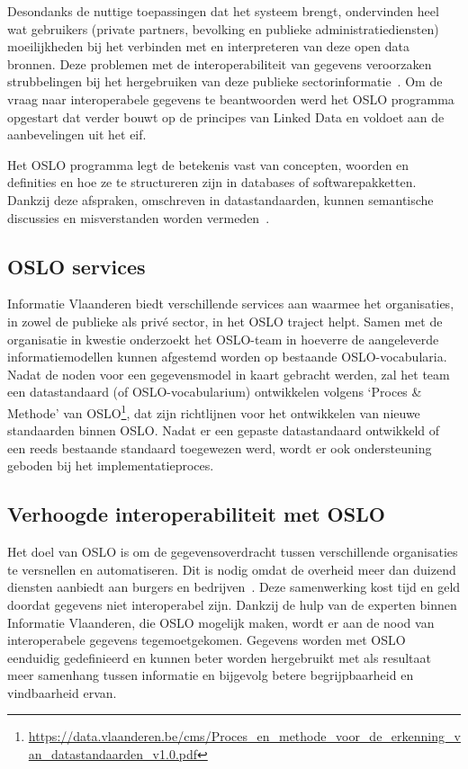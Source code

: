 Desondanks de nuttige toepassingen dat het systeem brengt, ondervinden heel wat gebruikers (private partners, bevolking en publieke administratiediensten) moeilijkheden bij het verbinden met en interpreteren van deze open data bronnen. Deze problemen met de interoperabiliteit van gegevens veroorzaken strubbelingen bij het hergebruiken van deze publieke sectorinformatie~\cite{opengovernment}. Om de vraag naar interoperabele gegevens te beantwoorden werd het OSLO programma opgestart dat verder bouwt op de principes van Linked Data en voldoet aan de aanbevelingen uit het \acrshort{eif}.

Het OSLO programma legt de betekenis vast van concepten, woorden en definities en hoe ze te structureren zijn in databases of softwarepakketten. Dankzij deze afspraken, omschreven in datastandaarden, kunnen semantische discussies en misverstanden worden vermeden~\cite{OSLO_handleiding}.

\subsection{OSLO services}
\label{sec:oslo_services}
Informatie Vlaanderen biedt verschillende services aan waarmee het organisaties, in zowel de publieke als privé sector, in het OSLO traject helpt. Samen met de organisatie in kwestie onderzoekt het OSLO-team in hoeverre de aangeleverde informatiemodellen kunnen afgestemd worden op bestaande OSLO-vocabularia. Nadat de noden voor een gegevensmodel in kaart gebracht werden, zal het team een datastandaard (of OSLO-vocabularium) ontwikkelen volgens `Proces \& Methode' van OSLO\footnote{\url{https://data.vlaanderen.be/cms/Proces_en_methode_voor_de_erkenning_van_datastandaarden_v1.0.pdf}}, dat zijn richtlijnen voor het ontwikkelen van nieuwe standaarden binnen OSLO. Nadat er een gepaste datastandaard ontwikkeld of een reeds bestaande standaard toegewezen werd, wordt er ook ondersteuning geboden bij het implementatieproces.

\subsection{Verhoogde interoperabiliteit met OSLO}
Het doel van OSLO is om de gegevensoverdracht tussen verschillende organisaties te versnellen en automatiseren. Dit is nodig omdat de overheid meer dan duizend diensten aanbiedt aan burgers en bedrijven~\cite{OSLO_handleiding}. Deze samenwerking kost tijd en geld doordat gegevens niet interoperabel zijn. Dankzij de hulp van de experten binnen Informatie Vlaanderen, die OSLO mogelijk maken, wordt er aan de nood van interoperabele gegevens tegemoetgekomen. Gegevens worden met OSLO eenduidig gedefinieerd en kunnen beter worden hergebruikt met als resultaat meer samenhang tussen informatie en bijgevolg betere begrijpbaarheid en vindbaarheid ervan.


